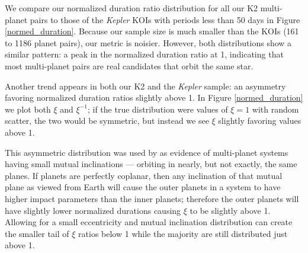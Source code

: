 \documentclass[twocolumn]{aastex62}
\newcommand{\project}[1]{\textsl{#1}}
\newcommand{\nplanetpairs}{161}
\begin{document}
We compare our normalized duration ratio distribution for all our K2
multi-planet pairs to those of the \project{Kepler} KOIs with periods
less than 50 days in Figure \ref{normed_duration}. Because our sample
size is much smaller than the KOIs (\nplanetpairs{} to 1186 planet
pairs), our metric is noisier. However, both distributions show a
similar pattern: a peak in the normalized duration ratio at 1,
indicating that most multi-planet pairs are real candidates that orbit
the same star.

Another trend appears in both our K2 and the \project{Kepler} sample:
an asymmetry favoring normalized duration ratios slightly above 1. In
Figure \ref{normed_duration} we plot both $\xi$ and $\xi^{-1}$; if the
true distribution were values of $\xi=1$ with random scatter, the two
would be symmetric, but instead we see $\xi$ slightly favoring values
above 1.

This asymmetric distribution was used by \cite{fab14} as evidence of
multi-planet systems having small mutual inclinations --- orbiting in
nearly, but not exactly, the same planes.  If planets are perfectly
coplanar, then any inclination of that mutual plane as viewed from
Earth will cause the outer planets in a system to have higher impact
parameters than the inner planets; therefore the outer planets will
have slightly lower normalized durations causing $\xi$ to be slightly
above 1. Allowing for a small eccentricity and mutual inclination
distribution can create the smaller tail of $\xi$ ratios below 1 while
the majority are still distributed just above 1.
\end{document}
